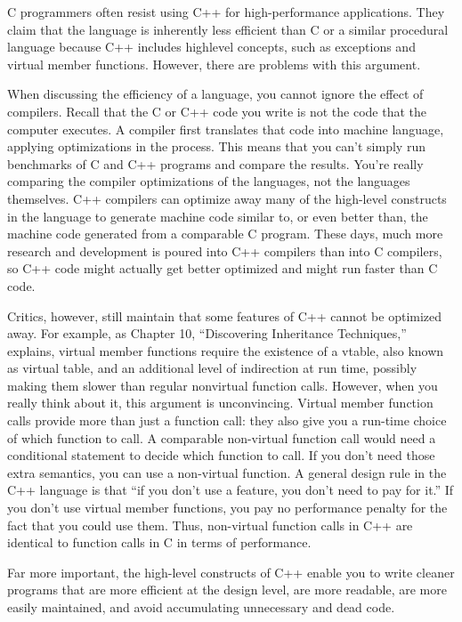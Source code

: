 
C programmers often resist using C++ for high-performance applications. They claim that the language is inherently less efficient than C or a similar procedural language because C++ includes highlevel concepts, such as exceptions and virtual member functions. However, there are problems with this argument.

When discussing the efficiency of a language, you cannot ignore the effect of compilers. Recall that the C or C++ code you write is not the code that the computer executes. A compiler first translates that code into machine language, applying optimizations in the process. This means that you can’t simply run benchmarks of C and C++ programs and compare the results. You’re really comparing the compiler optimizations of the languages, not the languages themselves. C++ compilers can optimize away many of the high-level constructs in the language to generate machine code similar to, or even better than, the machine code generated from a comparable C program. These days, much more research and development is poured into C++ compilers than into C compilers, so C++ code might actually get better optimized and might run faster than C code.

Critics, however, still maintain that some features of C++ cannot be optimized away. For example, as Chapter 10, “Discovering Inheritance Techniques,” explains, virtual member functions require the existence of a vtable, also known as virtual table, and an additional level of indirection at run time, possibly making them slower than regular nonvirtual function calls. However, when you really think about it, this argument is unconvincing. Virtual member function calls provide more than just a function call: they also give you a run-time choice of which function to call. A comparable non-virtual function call would need a conditional statement to decide which function to call. If you don’t need those extra semantics, you can use a non-virtual function. A general design rule in the C++ language is that “if you don’t use a feature, you don’t need to pay for it.” If you don’t use virtual member functions, you pay no performance penalty for the fact that you could use them. Thus, non-virtual function calls in C++ are identical to function calls in C in terms of performance.

Far more important, the high-level constructs of C++ enable you to write cleaner programs that are more efficient at the design level, are more readable, are more easily maintained, and avoid accumulating unnecessary and dead code.

